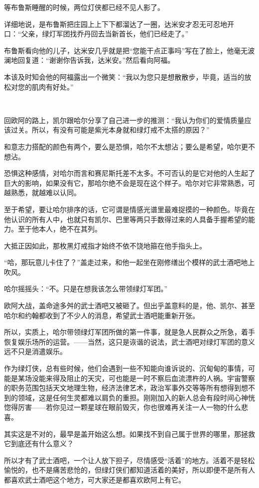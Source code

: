 \documentclass[../main]{subfiles}
\begin{document}
等布鲁斯睡醒的时候，两位灯侠都已经不见人影了。

详细地说，是布鲁斯把庄园上上下下都溜达了一圈，达米安才忍无可忍地开口：“父亲，绿灯军团找乔丹回去当新首长，他们已经走了。”

布鲁斯看向他的儿子，达米安几乎就是把“您能干点正事吗”写在了脸上，他毫无波澜地回复道：“谢谢你告诉我，达米安。”然后看向阿福。

本该及时知会他的阿福露出一个微笑：“我以为您只是想散散步，毕竟，适当的放松对您的肌肉有好处。”

~\

回欧阿的路上，凯尔跟哈尔分享了自己进一步的推测：“我认为你们的爱情质量应该过关。所以，有没有可能是紫光本身就和绿灯戒不太搭的原因？”

和意志力搭配的颜色有两个，要么是恐惧，哈尔不太想沾；要么是希望，哈尔更不想沾。

恐惧这种感情，对哈尔而言和赛尼斯托差不太多。不可否认的是它对他的人生起了巨大的影响，如果没有它，那哈尔绝不会是现在这个样子。哈尔对它非常熟悉，可越熟悉，就越难以认同。

至于希望，要让哈尔排序的话，它可谓是情感光谱里最难捉摸的一种颜色。毕竟在他认识的所有人中，也就只有凯尔、巴里等两只手数得过来的人具备手握希望的能力。至于他本人，绝不在其列。

大抵正因如此，那枚黑灯戒指才始终不依不饶地箍在他手指头上。

“哈，那玩意儿卡住了？”盖走过来，和他一起坐在刚修缮出个模样的武士酒吧地上吹风。

哈尔摇摇头：“不。只是在想我该怎么带领绿灯军团。”

欧阿大战，盖命途多舛的武士酒吧又被砸了。但出乎盖意料的是，他、凯尔、甚至哈尔和约翰都收到了不少人的消息，希望武士酒吧能重新开张。

所以，实质上，哈尔带领绿灯军团所做的第一件事，就是急人民群众之所急，着手恢复娱乐场所的运营。——当然，这只是诙谐的说法，武士酒吧对绿灯军团的意义远不只是消遣娱乐。

作为绿灯侠，总有些时候，他们会遇到一些不知能向谁诉说的、沉甸甸的事情，可能是某场没能来得及阻止的天灾，可也能是一时不察后血流漂杵的人祸。宇宙警察的职务范围包括天文地理生物，经济法律艺术，政治军事外交等等所有想得到想不到的领域，这是任何生灵都难以肩负的重担。刚刚加入的新人总会有段时间心神恍惚得厉害——若你见过一颗星球在眼前毁灭，你也很难再关注一人一物的什么悲喜。

其实这是不对的，最早是盖开始这么想。如果找不到自己属于世界的哪里，那拯救它到底还有什么意义？

所以才有了武士酒吧，一个让人放下担子，尽情感受“活着”的地方。活着不是轻松愉悦的，也不是痛苦悲怆的，但绿灯侠们都知道活着的美好，所以即便不是所有人都喜欢武士酒吧这个地方，可大家还是都喜欢欧阿上有它。
\end{document}

